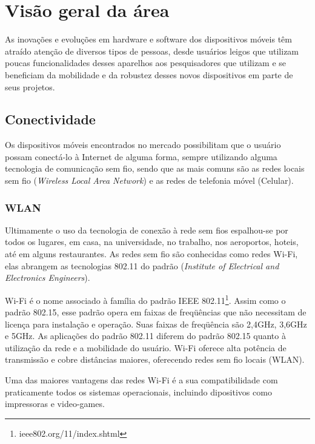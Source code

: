 \chapter{Visão geral da área}\label{cha:visaogeral}

As inovações e evoluções em hardware e software dos dispositivos móveis têm atraído atenção de diversos tipos de pessoas, desde usuários leigos que utilizam poucas funcionalidades desses aparelhos aos pesquisadores que utilizam e se beneficiam da mobilidade e da robustez desses novos dispositivos em parte de seus projetos.

\section{Conectividade}
Os dispositivos móveis encontrados no mercado possibilitam que o usuário possam conectá-lo à Internet de alguma forma, sempre utilizando alguma tecnologia de comunicação sem fio, sendo que as mais comuns são as redes locais sem fio  (\textit{Wireless Local Area Network}) e as redes de telefonia móvel (Celular).
\subsection{WLAN}
Ultimamente o uso da tecnologia de conexão à rede sem fios espalhou-se por todos os lugares, em casa, na universidade, no trabalho, nos aeroportos, hoteis, até em alguns restaurantes.
As redes sem fio são conhecidas como redes Wi-Fi, elas abrangem as tecnologias 802.11 do padrão  (\textit{Institute of Electrical and Electronics Engineers}).
\begin{citacao}
Wi-Fi é o nome associado à família do padrão IEEE 802.11\footnote{ieee802.org/11/index.shtml}. Assim como o
padrão 802.15, esse padrão opera em faixas de freqüências que não necessitam de licença para instalação e operação. Suas faixas de freqüência são 2,4GHz, 3,6GHz e 5GHz. As aplicações do padrão 802.11 diferem do padrão 802.15 quanto à utilização da rede e a mobilidade do usuário. Wi-Fi oferece alta potência de transmissão e cobre distâncias maiores, oferecendo redes sem fio locais (WLAN). \cite{vanni09}
\end{citacao}
Uma das maiores vantagens das redes Wi-Fi é a sua compatibilidade com praticamente todos os sistemas operacionais, incluindo dipositivos como impressoras e video-games.

